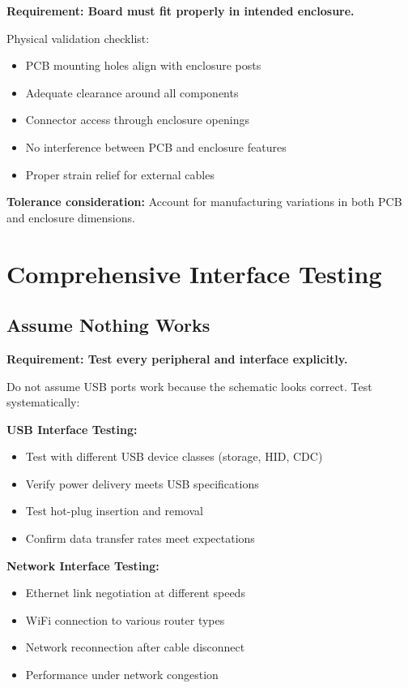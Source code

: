 \textbf{Requirement: Board must fit properly in intended enclosure.}

Physical validation checklist:
\begin{itemize}
\item PCB mounting holes align with enclosure posts
\item Adequate clearance around all components
\item Connector access through enclosure openings
\item No interference between PCB and enclosure features
\item Proper strain relief for external cables
\end{itemize}

\textbf{Tolerance consideration:} Account for manufacturing variations in both PCB and enclosure dimensions.

\section{Comprehensive Interface Testing}

\subsection{Assume Nothing Works}

\textbf{Requirement: Test every peripheral and interface explicitly.}

Do not assume USB ports work because the schematic looks correct. Test systematically:

\textbf{USB Interface Testing:}
\begin{itemize}
\item Test with different USB device classes (storage, HID, CDC)
\item Verify power delivery meets USB specifications
\item Test hot-plug insertion and removal
\item Confirm data transfer rates meet expectations
\end{itemize}

\textbf{Network Interface Testing:}
\begin{itemize}
\item Ethernet link negotiation at different speeds
\item WiFi connection to various router types
\item Network reconnection after cable disconnect
\item Performance under network congestion
\end{itemize}

